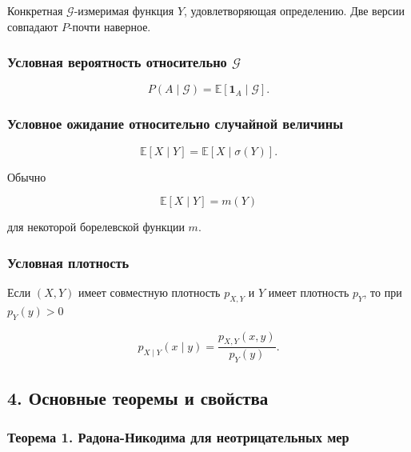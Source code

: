 \documentclass[
  11pt,
  a4paper,
]{article}
\begin{document}
Конкретная \(\mathcal G\)-измеримая функция \(Y\), удовлетворяющая
определению. Две версии совпадают \(P\)-почти наверное.

\subsubsection{\texorpdfstring{Условная вероятность относительно
\(\mathcal G\)}{Условная вероятность относительно \textbackslash mathcal G}}\label{ux443ux441ux43bux43eux432ux43dux430ux44f-ux432ux435ux440ux43eux44fux442ux43dux43eux441ux442ux44c-ux43eux442ux43dux43eux441ux438ux442ux435ux43bux44cux43dux43e-mathcal-g}

\[
P(A\mid\mathcal G)=\mathbb E[\mathbf 1_A\mid\mathcal G].
\]

\subsubsection{Условное ожидание относительно случайной
величины}\label{ux443ux441ux43bux43eux432ux43dux43eux435-ux43eux436ux438ux434ux430ux43dux438ux435-ux43eux442ux43dux43eux441ux438ux442ux435ux43bux44cux43dux43e-ux441ux43bux443ux447ux430ux439ux43dux43eux439-ux432ux435ux43bux438ux447ux438ux43dux44b}

\[
\mathbb E[X\mid Y]
=
\mathbb E[X\mid\sigma(Y)].
\]

Обычно

\[
\mathbb E[X\mid Y]=m(Y)
\]

для некоторой борелевской функции \(m\).

\subsubsection{Условная
плотность}\label{ux443ux441ux43bux43eux432ux43dux430ux44f-ux43fux43bux43eux442ux43dux43eux441ux442ux44c}

Если \((X,Y)\) имеет совместную плотность \(p_{X,Y}\) и \(Y\) имеет
плотность \(p_Y\), то при \(p_Y(y)>0\)

\[
p_{X\mid Y}(x\mid y)
=
\frac{p_{X,Y}(x,y)}{p_Y(y)}.
\]

\subsection{4. Основные теоремы и
свойства}\label{ux43eux441ux43dux43eux432ux43dux44bux435-ux442ux435ux43eux440ux435ux43cux44b-ux438-ux441ux432ux43eux439ux441ux442ux432ux430}

\subsubsection{Теорема 1. Радона-Никодима для неотрицательных
мер}\label{ux442ux435ux43eux440ux435ux43cux430-1.-ux440ux430ux434ux43eux43dux430-ux43dux438ux43aux43eux434ux438ux43cux430-ux434ux43bux44f-ux43dux435ux43eux442ux440ux438ux446ux430ux442ux435ux43bux44cux43dux44bux445-ux43cux435ux440}
\end{document}
